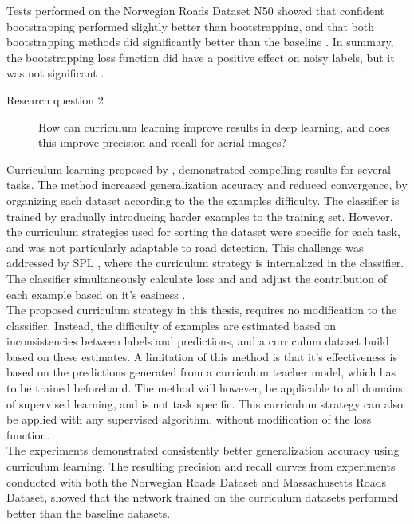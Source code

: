 Tests performed on the Norwegian Roads Dataset N50 showed that confident bootstrapping performed slightly better than bootstrapping, and that both bootstrapping methods did significantly better than the baseline . In summary, the bootstrapping loss function did have a positive effect on noisy labels, but it was not significant . 


\begin{description}
\item[Research question 2]  How can curriculum learning improve results in deep learning, and does this improve precision and recall for aerial images?
\end{description}

Curriculum learning proposed by \cite{Bengio_curriculumlearning}, demonstrated compelling results for several tasks. The method increased generalization accuracy and reduced convergence, by organizing each dataset according to the the examples difficulty. The classifier is trained by gradually introducing harder examples to the training set. However, the curriculum strategies used for sorting the dataset were specific for each task, and was not particularly adaptable to road detection. This challenge was addressed by \ac{SPL} \citep{Kumar_self_paced_learning}, where the curriculum strategy is internalized in the classifier. The classifier simultaneously calculate loss and and adjust the contribution of each example based on it's easiness  .\\

The proposed curriculum strategy in this thesis, requires no modification to the classifier. Instead, the difficulty of examples are estimated based on inconsistencies between labels and predictions, and a curriculum dataset build based on these estimates. A limitation of this method is that it's effectiveness is based on the predictions generated from a curriculum teacher model, which has to be trained beforehand. The method will however, be applicable to all domains of supervised learning, and  is not task specific. This curriculum strategy can also be applied with any supervised algorithm, without modification of the loss function. \\

The experiments demonstrated consistently better generalization accuracy using curriculum learning. The resulting precision and recall curves from experiments conducted with both the Norwegian Roads Dataset and Massachusetts Roads Dataset, showed that the network trained on the curriculum datasets performed better than the baseline datasets.\\

